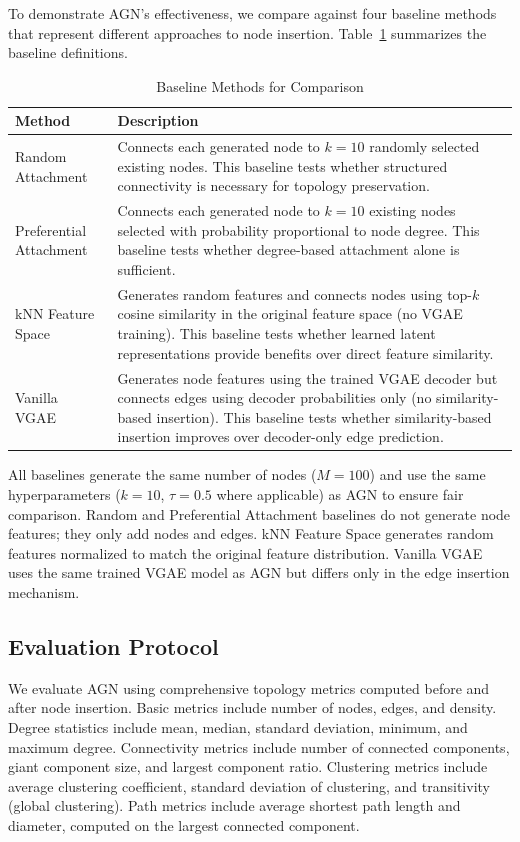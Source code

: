 \documentclass[12pt]{article}
\begin{document}
To demonstrate AGN's effectiveness, we compare against four baseline methods that represent different approaches to node insertion. Table~\ref{tab:baselines} summarizes the baseline definitions.

\begin{table}[h]
\centering
\caption{Baseline Methods for Comparison}
\label{tab:baselines}
\small
\begin{tabular}{lp{9.5cm}}
\toprule
Method & Description \\
\midrule
Random Attachment & Connects each generated node to $k=10$ randomly selected existing nodes. This baseline tests whether structured connectivity is necessary for topology preservation. \\
Preferential Attachment & Connects each generated node to $k=10$ existing nodes selected with probability proportional to node degree. This baseline tests whether degree-based attachment alone is sufficient. \\
kNN Feature Space & Generates random features and connects nodes using top-$k$ cosine similarity in the original feature space (no VGAE training). This baseline tests whether learned latent representations provide benefits over direct feature similarity. \\
Vanilla VGAE & Generates node features using the trained VGAE decoder but connects edges using decoder probabilities only (no similarity-based insertion). This baseline tests whether similarity-based insertion improves over decoder-only edge prediction. \\
\bottomrule
\end{tabular}
\end{table}

All baselines generate the same number of nodes ($M=100$) and use the same hyperparameters ($k=10$, $\tau=0.5$ where applicable) as AGN to ensure fair comparison. Random and Preferential Attachment baselines do not generate node features; they only add nodes and edges. kNN Feature Space generates random features normalized to match the original feature distribution. Vanilla VGAE uses the same trained VGAE model as AGN but differs only in the edge insertion mechanism.

\subsection{Evaluation Protocol}

We evaluate AGN using comprehensive topology metrics computed before and after node insertion. Basic metrics include number of nodes, edges, and density. Degree statistics include mean, median, standard deviation, minimum, and maximum degree. Connectivity metrics include number of connected components, giant component size, and largest component ratio. Clustering metrics include average clustering coefficient, standard deviation of clustering, and transitivity (global clustering). Path metrics include average shortest path length and diameter, computed on the largest connected component.
\end{document}
